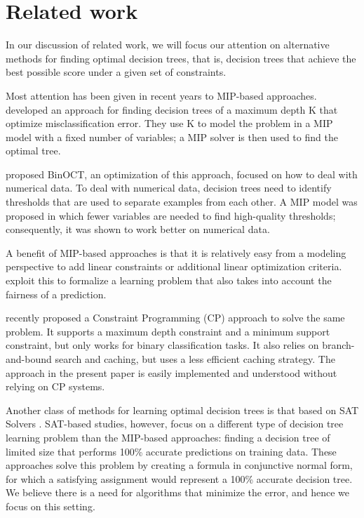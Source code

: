 \section{Related work}
In our discussion of related work, we will focus our attention on alternative methods for finding optimal decision trees, that is, decision trees that achieve the best possible score under a given set of constraints.

Most attention has been given in recent years to MIP-based approaches. \cite{bertsimas:2017optimal} %
developed an approach for finding decision trees of a maximum depth K that optimize misclassification error. They use K to model the problem in a MIP model with a fixed number of variables; a MIP solver is then used to find the optimal tree.

\cite{verwer:2019learning} %
proposed BinOCT, an optimization of this approach, focused on how to deal with numerical data. To deal with numerical data, decision trees need to identify thresholds that are used to separate examples from each other. A MIP model was proposed in which fewer variables are needed to find high-quality thresholds; consequently, it was shown to work better on numerical data.

A benefit of MIP-based approaches is that it is relatively easy from a modeling perspective to add linear constraints or additional linear optimization criteria. \cite{aghaei:2019learning} %
exploit this to formalize a learning problem that also takes into account the fairness of a prediction.

\cite{verwer:2019learning} %
recently proposed a Constraint Programming (CP) approach to solve the same problem. It supports a maximum depth constraint and a minimum support constraint, but only works for binary classification tasks. It also relies on branch-and-bound search and caching, but uses a less efficient caching strategy. The approach in the present paper is easily implemented and understood without relying on CP systems.

Another class of methods for learning optimal decision trees is that based on SAT Solvers \cite{narodytska:2018verifying,bessiere:2009minimising}. SAT-based studies, however, focus on a different type of decision tree learning problem than the MIP-based approaches: finding a decision tree of limited size that performs 100\% accurate predictions on training data. These approaches solve this problem by creating a formula in conjunctive normal form, for which a satisfying assignment would represent a 100\% accurate decision tree. We believe there is a need for algorithms that minimize the error, and hence we focus on this setting.

